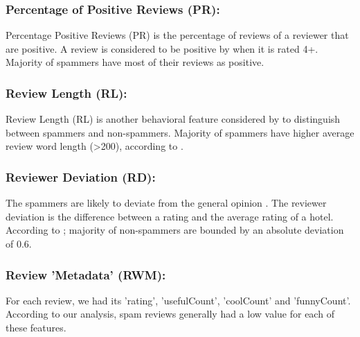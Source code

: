 \documentclass{llncs}
\begin{document}
\subsubsection{Percentage of Positive Reviews (PR):}
%
Percentage Positive Reviews (PR) is the percentage of reviews of a reviewer that are positive. A review is considered to be positive by \cite{arjun:et} when it is rated 4+. Majority of spammers have most of their reviews as positive.
%
\subsubsection{Review Length (RL):}
%
Review Length (RL) is another behavioral feature considered by \cite{arjun:et} to distinguish between spammers and non-spammers. Majority of spammers have higher average review word length (>200), according to \cite{arjun:et}.
%
\subsubsection{Reviewer Deviation (RD):}
%
The spammers are likely to deviate from the general opinion \cite{arjun:et}.  The  reviewer deviation is the difference between a rating and the average rating of a hotel. According to \cite{arjun:et}; majority of non-spammers are bounded by an absolute deviation of 0.6.
%
\subsubsection{Review 'Metadata' (RWM):}
%
For each review, we had its 'rating', 'usefulCount', 'coolCount' and 'funnyCount'. According to our analysis, spam reviews generally had a low value for each of these features.
%
\end{document}
